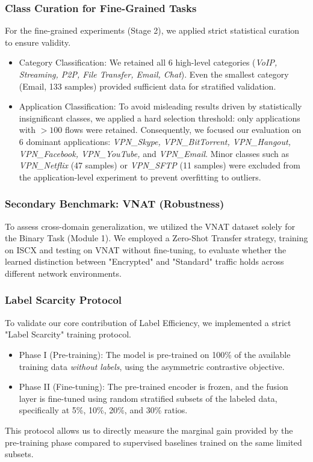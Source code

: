 \subsubsection{Class Curation for Fine-Grained Tasks}
For the fine-grained experiments (Stage 2), we applied strict statistical curation to ensure validity.
\begin{itemize}
    \item Category Classification: We retained all 6 high-level categories (\textit{VoIP, Streaming, P2P, File Transfer, Email, Chat}). Even the smallest category (Email, 133 samples) provided sufficient data for stratified validation.
    \item Application Classification: To avoid misleading results driven by statistically insignificant classes, we applied a hard selection threshold: only applications with $>100$ flows were retained. Consequently, we focused our evaluation on 6 dominant applications: \textit{VPN\_Skype, VPN\_BitTorrent, VPN\_Hangout, VPN\_Facebook, VPN\_YouTube,} and \textit{VPN\_Email}. Minor classes such as \textit{VPN\_Netflix} (47 samples) or \textit{VPN\_SFTP} (11 samples) were excluded from the application-level experiment to prevent overfitting to outliers.
\end{itemize}

\subsubsection{Secondary Benchmark: VNAT (Robustness)}
To assess cross-domain generalization, we utilized the VNAT dataset solely for the Binary Task (Module 1). We employed a Zero-Shot Transfer strategy, training on ISCX and testing on VNAT without fine-tuning, to evaluate whether the learned distinction between "Encrypted" and "Standard" traffic holds across different network environments.

\subsubsection{Label Scarcity Protocol}
To validate our core contribution of Label Efficiency, we implemented a strict "Label Scarcity" training protocol. 
\begin{itemize}
    \item Phase I (Pre-training): The model is pre-trained on 100\% of the available training data \textit{without labels}, using the asymmetric contrastive objective.
    \item Phase II (Fine-tuning): The pre-trained encoder is frozen, and the fusion layer is fine-tuned using random stratified subsets of the labeled data, specifically at 5\%, 10\%, 20\%, and 30\% ratios.
\end{itemize}
This protocol allows us to directly measure the marginal gain provided by the pre-training phase compared to supervised baselines trained on the same limited subsets.

